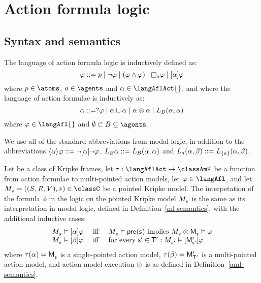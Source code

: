 \chapter{Action formula logic}

\section{Syntax and semantics}

\begin{definition}
The language \langAfl{} of action formula logic is inductively defined as:
$$
\phi ::= \atomP \mid 
       \neg \phi \mid
       (\phi \land \phi) \mid
       \necessaryA \phi \mid
       \actionA{\alpha} \phi
$$
where $\atomP \in \atoms$, $\agentA \in \agents$ and $\alpha \in \langAflAct{}$, and where the language \langAflAct{} of action formulae is inductively as:
$$
\alpha ::= \test{\phi} \mid
       \alpha \choice \alpha \mid
       \alpha \compose \alpha \mid
       \learnsBs (\alpha, \alpha)
$$
where $\phi \in \langAfl{}$ and $\emptyset \subset \agentsB \subseteq \agents$.
\end{definition}

We use all of the standard abbreviations from modal logic, in addition to the abbreviations $\actionE{\alpha} \phi ::= \lnot \actionA{\alpha} \lnot \phi$, $\learnsBs \alpha ::= \learnsBs (\alpha, \alpha)$ and $\learnsA (\alpha, \beta) ::= \learns[{\{\agentA\}}] (\alpha, \beta)$.

\begin{definition}
Let \classC{} be a class of Kripke frames, let $\tau : \langAflAct \to \classAmK$ be a function from action formulae to multi-pointed action models, let $\phi \in \langAfl$, and let $\kPModelAndTuple{\kStateS} \in \classC$ be a pointed Kripke model.
The interpetation of the formula $\phi$ in the logic \logicAflC{} on the pointed Kripke model $\kPModel{\kStateS}$ is the same as its interpretation in modal logic, defined in Definition~\ref{ml-semantics}, with the additional inductive cases:
$$
\begin{array}{lcl}
    \kPModel{\kStateS} \entails \actionA{\alpha} \phi & \text { iff } & \kPModel{\kStateS} \entails \aPrecondition(\aStateS) \text{ implies } \kPModel{\kStateS} \exec \aPModel{\aStateS} \entails \phi\\
    \kPModel{\kStateS} \entails \actionA{\beta} \phi & \text { iff } & \text{for every } \aStateSP \in \aStatesTP: \kPModel{\kStateSP} \entails \actionA{\aPModelP{\aStateSP}} \phi
\end{array}
$$
where $\tau(\alpha) = \aPModel{\aStateS}$ is a single-pointed action model, $\tau(\beta) = \aPModelP{\aStatesTP}$ is a multi-pointed action model, and action model execution $\exec$ is as defined in Definition~\ref{aml-semantics}.
\end{definition}

